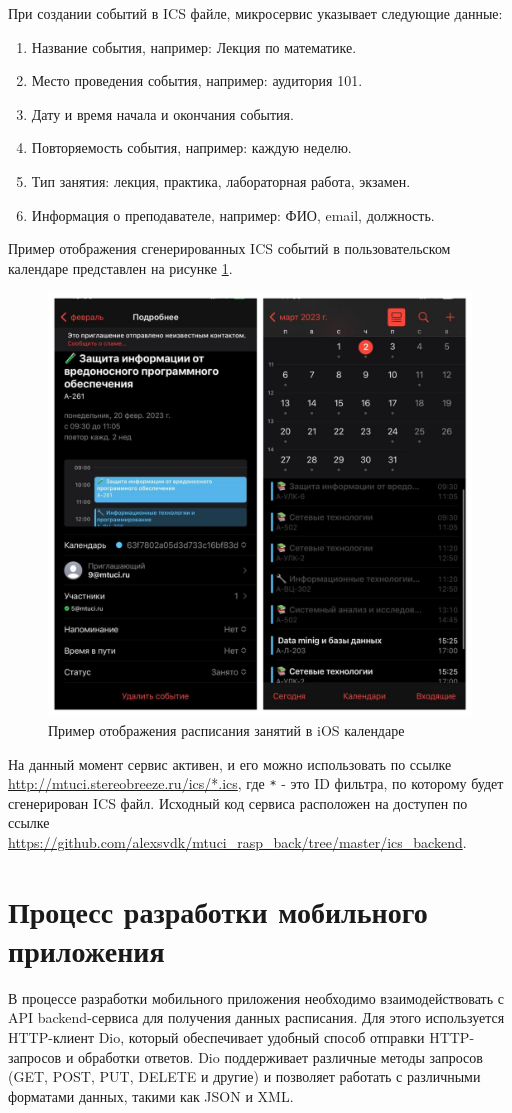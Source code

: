 При создании событий в ICS файле, микросервис указывает следующие данные:
\begin{enumerate}
  \item Название события, например: Лекция по математике.
  \item Место проведения события, например: аудитория 101.
  \item Дату и время начала и окончания события.
  \item Повторяемость события, например: каждую неделю.
  \item Тип занятия: лекция, практика, лабораторная работа, экзамен.
  \item Информация о преподавателе, например: ФИО, email, должность.
\end{enumerate}
Пример отображения сгенерированных ICS событий в пользовательском календаре представлен на рисунке \ref{fig:back:ics}.

\begin{figure}
  \centering
  \includegraphics[width=0.7\linewidth]{images/back/ics.png}
  \caption{Пример отображения расписания занятий в iOS календаре}
  \label{fig:back:ics}
\end{figure}


На данный момент сервис активен, и его можно использовать по ссылке \url{http://mtuci.stereobreeze.ru/ics/*.ics}, 
где \texttt{*} - это ID фильтра, по которому будет сгенерирован ICS файл.
Исходный код сервиса расположен на доступен по ссылке \url{https://github.com/alexsvdk/mtuci_rasp_back/tree/master/ics_backend}.

\section{Процесс разработки мобильного приложения}
В процессе разработки мобильного приложения необходимо взаимодействовать с API backend-сервиса для получения данных расписания. 
Для этого используется HTTP-клиент Dio, который обеспечивает удобный способ отправки HTTP-запросов и обработки ответов. 
Dio поддерживает различные методы запросов (GET, POST, PUT, DELETE и другие) и позволяет работать 
с различными форматами данных, такими как JSON и XML.

